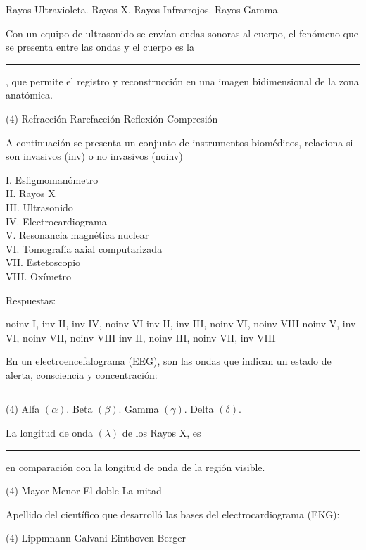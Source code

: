 \documentclass[12pt, letter]{exam}
\begin{document}
\begin{questions}
    \begin{multicols}{2}
    \begin{tasks}
        \task Rayos Ultravioleta.
        \task Rayos X.
        \task Rayos Infrarrojos.
        \task Rayos Gamma.
    \end{tasks}
    \end{multicols}
    \question Con un equipo de ultrasonido se envían ondas sonoras al cuerpo, el fenómeno que se presenta entre las ondas y el cuerpo es la \rule{2cm}{0.1mm}, que permite el registro y reconstrucción en una imagen bidimensional de la zona anatómica.
    \begin{tasks}(4)
        \task Refracción
        \task Rarefacción
        \task Reflexión
        \task Compresión
    \end{tasks}

    \newpage

    \question A continuación se presenta un conjunto de instrumentos biomédicos, relaciona si son invasivos (inv) o no invasivos (noinv)
    \begin{multicols}{2}
        I. Esfigmomanómetro \\
        II. Rayos X  \\
        III. Ultrasonido \\
        IV. Electrocardiograma \\
        V. Resonancia magnética nuclear \\
        VI. Tomografía axial computarizada \\
        VII. Estetoscopio \\
        VIII. Oxímetro
    \end{multicols}

    \vspace{0.3cm}
    Respuestas:
    \begin{tasks}
        \task noinv-I, inv-II, inv-IV, noinv-VI
        \task inv-II, inv-III, noinv-VI, noinv-VIII
        \task noinv-V, inv-VI, noinv-VII, noinv-VIII
        \task inv-II, noinv-III, noinv-VII, inv-VIII
    \end{tasks}
    \question En un electroencefalograma (EEG), son las ondas que indican un estado de alerta, consciencia y concentración: \rule{2cm}{0.1mm}
    \begin{tasks}(4)
        \task Alfa $(\alpha)$.
        \task Beta $(\beta)$.
        \task Gamma $(\gamma)$.
        \task Delta $(\delta)$.
    \end{tasks}
    \question La longitud de onda $(\lambda)$ de los Rayos X, es \rule{2cm}{0.1mm} en comparación con la longitud de onda de la región visible.
    \begin{tasks}(4)
        \task Mayor
        \task Menor
        \task El doble
        \task La mitad
    \end{tasks}
    \question Apellido del científico que desarrolló las bases del electrocardiograma (EKG):
    \begin{tasks}(4)
        \task Lippmnann
        \task Galvani
        \task Einthoven
        \task Berger
    \end{tasks}


\end{questions}
\end{document}
